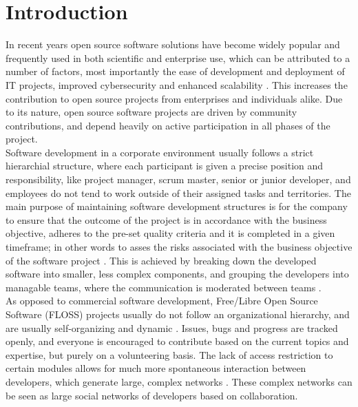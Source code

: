 \thepage
\section{Introduction}


In recent years open source software solutions have become widely popular and frequently used in both scientific and enterprise use, which can be attributed to a number of factors, most importantly the ease of development and deployment of IT projects, improved cybersecurity and enhanced scalability \cite{pwcLeadingBenefitsOpensource2016}. This increases the contribution to open source projects from enterprises and individuals alike. Due to its nature, open source software projects are driven by community contributions, and depend heavily on active participation in all phases of the project. \\

Software development in a corporate environment usually follows a strict hierarchial structure, where each participant is given a precise position and responsibility, like project manager, scrum master, senior or junior developer, and employees do not tend to work outside of their assigned tasks and territories. The main purpose of maintaining software development structures is for the company to ensure that the outcome of the project is in accordance with the business objective, adheres to the pre-set quality criteria and it is completed in a given timeframe; in other words to asses the risks associated with the business objective of the software project \cite{surekaUsingSocialNetwork2011}. This is achieved by breaking down the developed software into smaller, less complex components, and grouping the developers into managable teams, where the communication is moderated between teams \cite{birdLatentSocialStructure2008}. \\

As opposed to commercial software development, Free/Libre Open Source Software (FLOSS) projects usually do not follow an organizational hierarchy, and are usually self-organizing and dynamic \cite{birdLatentSocialStructure2008}. Issues, bugs and progress are tracked openly, and everyone is encouraged to contribute based on the current topics and expertise, but purely on a volunteering basis. The lack of access restriction to certain modules allows for much more spontaneous interaction between developers, which generate large, complex networks \cite{martinez-romoUsingSocialNetwork2008}. These complex networks can be seen as large social networks of developers based on collaboration. \\


